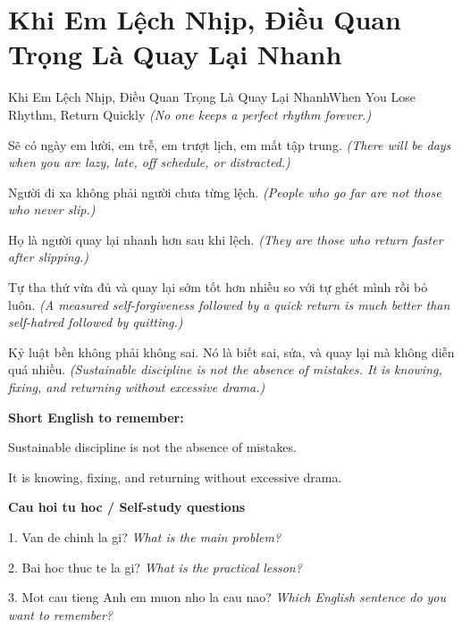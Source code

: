 \section{Khi Em Lệch Nhịp, Điều Quan Trọng Là Quay Lại Nhanh}
\begin{truyen}{Khi Em Lệch Nhịp, Điều Quan Trọng Là Quay Lại Nhanh}{When You Lose Rhythm, Return Quickly}
\textit{(No one keeps a perfect rhythm forever.)}

Sẽ có ngày em lười, em trễ, em trượt lịch, em mất tập trung.
\textit{(There will be days when you are lazy, late, off schedule, or distracted.)}

Người đi xa không phải người chưa từng lệch.
\textit{(People who go far are not those who never slip.)}

Họ là người quay lại nhanh hơn sau khi lệch.
\textit{(They are those who return faster after slipping.)}

Tự tha thứ vừa đủ và quay lại sớm tốt hơn nhiều so với tự ghét mình rồi bỏ luôn.
\textit{(A measured self-forgiveness followed by a quick return is much better than self-hatred followed by quitting.)}

\end{truyen}

\begin{baihoc}
Kỷ luật bền không phải không sai. Nó là biết sai, sửa, và quay lại mà không diễn quá nhiều.
\textit{(Sustainable discipline is not the absence of mistakes. It is knowing, fixing, and returning without excessive drama.)}
\end{baihoc}

\begin{ghinhoanh}
\textbf{Short English to remember:}

Sustainable discipline is not the absence of mistakes.

It is knowing, fixing, and returning without excessive drama.

\end{ghinhoanh}

\begin{tuhocnhanh}
\textbf{Cau hoi tu hoc / Self-study questions}

1. Van de chinh la gi? \textit{What is the main problem?}

2. Bai hoc thuc te la gi? \textit{What is the practical lesson?}

3. Mot cau tieng Anh em muon nho la cau nao? \textit{Which English sentence do you want to remember?}
\end{tuhocnhanh}
\ngancach

